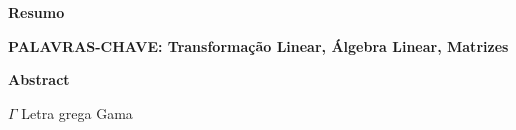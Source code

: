 \documentclass[12pt, a4paper,
 chapter=TITLE,
  section=TITLE,
   subsection=TITLE,
    subsubsection=TITLE]{abntex2}
\begin{document}
	\newpage
	
	\begin{center}
		\textbf{Resumo}
		
		\vspace{0.5cm}
		

		
		
	\end{center}
	
	\vspace{0.5cm}
	
	\textbf{PALAVRAS-CHAVE: Transformação Linear, Álgebra Linear, Matrizes}
	
	\newpage
	
	\begin{center}
		\textbf{Abstract}
		
		\vspace{1cm}
		

		
	\end{center}
	
	
	\newpage
	
	\listoffigures
	
	\newpage
	
	\listoftables
	
	\newpage
	
	\begin{simbolos}
		\item[$ \Gamma $] Letra grega Gama
	\end{simbolos}
	
	
	\tableofcontents
	
	
	\textual
	
	
		
	
	
	

	
	
		

	
	
	

	
	
		
		
	
	
		
\end{document}
